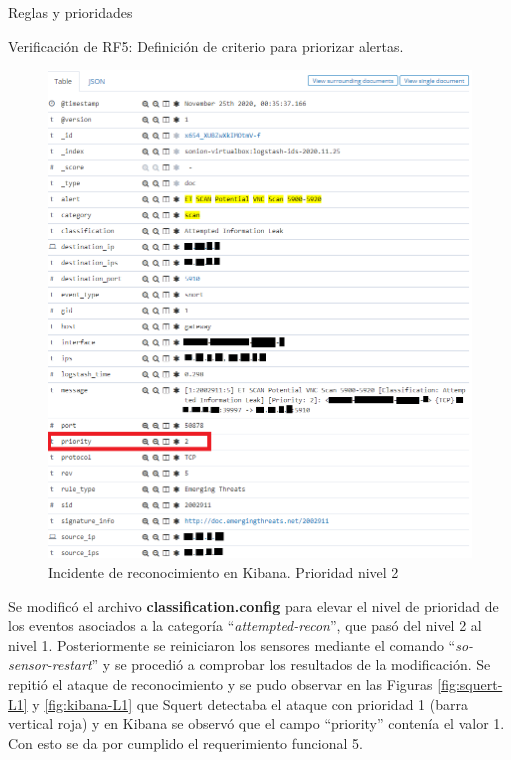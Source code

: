 \begin{section}{Reglas y prioridades}
\begin{section}{Verificación de RF5: Definición de criterio para priorizar alertas.}
\begin{figure}[H]
        \includegraphics[width=1\textwidth]{./iteracion_3_imagenes/kibana_ataques_L2_1EDITADO.png}
        \caption{Incidente de reconocimiento en Kibana. Prioridad nivel 2}
        \label{fig:Kibana-L2}
    \end{figure}
    \FloatBarrier
    Se modificó el archivo \textbf{classification.config} para elevar el nivel de prioridad de los eventos asociados a la categoría “\textit{attempted-recon}”, que pasó del nivel 2 al nivel 1. Posteriormente se reiniciaron los sensores mediante el comando “\textit{so-sensor-restart}” y se procedió a comprobar los resultados de la modificación. Se repitió el ataque de reconocimiento y se pudo observar en las Figuras \ref{fig:squert-L1} y \ref{fig:kibana-L1} que Squert detectaba el ataque con prioridad 1 (barra vertical roja) y en Kibana se observó que el campo “priority” contenía el valor 1. Con esto se da por cumplido el requerimiento funcional 5.
    

\end{section}
\end{section}
